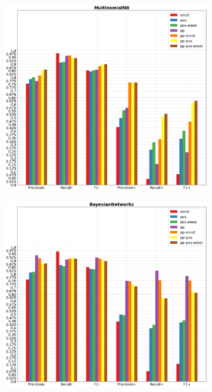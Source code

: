 \documentclass[oneside]{book}
\begin{document}
\begin{figure}[!h]
	\hspace*{-3cm}
	\begin{subfigure}[b]{0.5\textwidth}
		\centering
		\includegraphics[width=10cm]{assets/reports/micro/nobow/MultinomialNB.png}
	\end{subfigure}
	\hfill
	\begin{subfigure}[b]{0.5\textwidth}
		\hspace*{0.15cm}
		\centering
		\includegraphics[width=10cm]{assets/reports/micro/nobow/BayesianNetworks.png}
	\end{subfigure}
\end{figure}
\vfill
\end{document}

